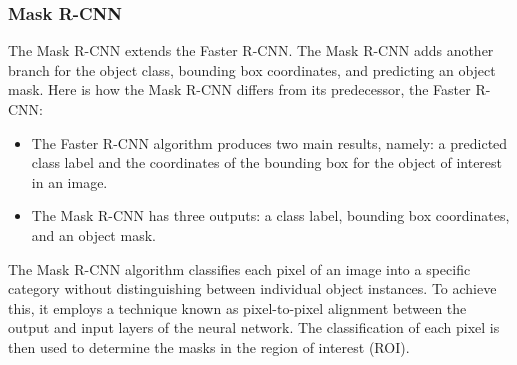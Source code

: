 \subsubsection{Mask R-CNN}
The Mask R-CNN extends the Faster R-CNN. The Mask R-CNN adds another branch for the object class, bounding box coordinates, and predicting an object mask.
Here is how the Mask R-CNN differs from its predecessor, the Faster R-CNN:
\begin{itemize}
    \item The Faster R-CNN algorithm produces two main results, namely: a predicted class label and the coordinates of the bounding box for the object of interest in an image.
    \item The Mask R-CNN has three outputs: a class label, bounding box coordinates, and an object mask.
\end{itemize}
The Mask R-CNN algorithm classifies each pixel of an image into a specific category without distinguishing between individual object instances. To achieve this, it employs a technique known as pixel-to-pixel alignment between the output and input layers of the neural network. The classification of each pixel is then used to determine the masks in the region of interest (ROI).\cite{he2017mask}

